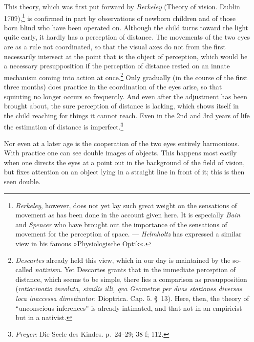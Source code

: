 \documentclass[12pt,a4paper]{book}
\newcommand{\opage}[1]{\marginnote{\footnotesize\textit{[#1]}}}
\begin{document}
This theory, which was first put forward by \emph{Berkeley} (Theory of
vision. Dublin 1709),\footnote{\emph{Berkeley}, however, does not yet
lay such great weight on the sensations of movement as has been done in
the account given here. It is especially \emph{Bain} and \emph{Spencer}
who have brought out the importance of the sensations of movement for
the perception of space. --- \emph{Helmholtz} has expressed a similar
view in his famous »Physiologische Optik«.} is confirmed in part by
observations of newborn children and of those born blind who have been
operated on. Although the child turns toward the light quite early, it
hardly has a perception of distance. The movements of the two eyes are
as a rule not coordinated, so that the visual axes do not from the first
necessarily intersect at the point that is the object of perception,
which would be a necessary presupposition if the perception of distance
rested on an innate
mechanism coming into action at once.\footnote{\emph{Descartes} already
held this view, which in our day is maintained by the so-called
\emph{nativism}. Yet Descartes grants that in the immediate perception
of distance, which seems to be simple, there lies a comparison as
presupposition (\textit{ratiocinatio involuta, similis illi, qva Geometræ
per duas stationes diversas loca inaccessa dimetiuntur}. Dioptrica. Cap.
5. §~13). Here, then, the theory of ``unconscious inferences'' is already
intimated, and that not in an empiricist but in a nativist.} Only
gradually (in the course of the first three months) does practice in the
coordination of the eyes arise, so that squinting no longer occurs so
frequently. And even after the adjustment has been brought about, the
sure perception of distance is lacking, which shows itself in the child
reaching for things it cannot reach. Even in the 2nd and 3rd years of
life the estimation of distance is
imperfect.\footnote{\emph{Preyer}: Die Seele des Kindes. p.~24--29; 38
f; 112.}

Nor even at a later age is the cooperation of the two eyes entirely
harmonious. With practice one can see double images of objects. This
happens most easily when one directs the eyes
\opage{239}at a point out in the background of the field of vision, but
fixes attention on an object lying in a straight line in front of it;
this is then seen double.
\end{document}
